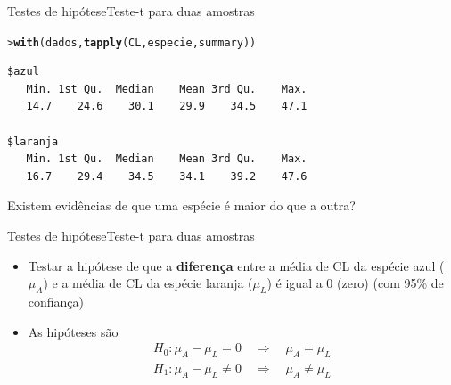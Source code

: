 \documentclass[10pt]{beamer}\usepackage[]{graphicx}\usepackage[]{color}
\makeatletter
\newcommand{\hlstd}[1]{\textcolor[rgb]{0.345,0.345,0.345}{#1}}%
\newcommand{\hlkwd}[1]{\textcolor[rgb]{0.282,0.239,0.545}{\textbf{#1}}}%
\newenvironment{kframe}{%
 \def\at@end@of@kframe{}%
 \ifinner\ifhmode%
  \def\at@end@of@kframe{\end{minipage}}%
  \begin{minipage}{\columnwidth}%
 \fi\fi%
 \def\FrameCommand##1{\hskip\@totalleftmargin \hskip-\fboxsep
 \colorbox{shadecolor}{##1}\hskip-\fboxsep
     \hskip-\linewidth \hskip-\@totalleftmargin \hskip\columnwidth}%
 \MakeFramed {\advance\hsize-\width
   \@totalleftmargin\z@ \linewidth\hsize
   \@setminipage}}%
 {\par\unskip\endMakeFramed%
 \at@end@of@kframe}
\newenvironment{knitrout}{}{} %
\makeatother
\begin{document}
\begin{frame}[fragile=singleslide]{Testes de hipótese}{Teste-t para duas amostras}
\begin{knitrout}\small
{}\color{fgcolor}\begin{kframe}
\begin{alltt}
\hlstd{> }\hlkwd{with}\hlstd{(dados,} \hlkwd{tapply}\hlstd{(CL, especie, summary))}
\end{alltt}
\begin{verbatim}
$azul
   Min. 1st Qu.  Median    Mean 3rd Qu.    Max. 
   14.7    24.6    30.1    29.9    34.5    47.1 

$laranja
   Min. 1st Qu.  Median    Mean 3rd Qu.    Max. 
   16.7    29.4    34.5    34.1    39.2    47.6 
\end{verbatim}
\end{kframe}
\end{knitrout}

Existem evidências de que uma espécie é maior do que a outra?
\end{frame}

\begin{frame}[fragile=singleslide]{Testes de hipótese}{Teste-t para duas amostras}
  \begin{itemize}
  \item Testar a hipótese de que a \textbf{diferença} entre a média de
    CL da espécie azul ($\mu_A$) e a média de CL da espécie laranja
    ($\mu_L$) é igual a 0 (zero) (com 95\% de confiança)
  \item As hipóteses são
    \begin{align*}
      H_0: \mu_A - \mu_L = 0 \quad \Rightarrow \quad \mu_A = \mu_L \\
      H_1: \mu_A - \mu_L \neq 0 \quad \Rightarrow \quad \mu_A \neq \mu_L
    \end{align*}
  \end{itemize}
\end{frame}
\end{document}
